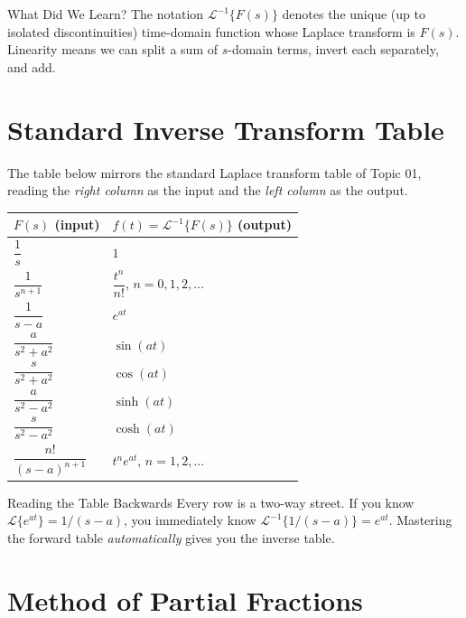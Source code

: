 \documentclass[12pt,a4paper]{article}
\begin{document}
\begin{learnbox}{What Did We Learn?}
The notation $\mathcal{L}^{-1}\{F(s)\}$ denotes the unique (up to isolated
discontinuities) time-domain function whose Laplace transform is $F(s)$.
Linearity means we can split a sum of $s$-domain terms, invert each separately,
and add.
\end{learnbox}

\section{Standard Inverse Transform Table}

The table below mirrors the standard Laplace transform table of Topic 01,
reading the \emph{right column} as the input and the \emph{left column} as the
output.

\begin{center}
\begin{tabular}{@{} l l @{}}
\toprule
\textbf{$F(s)$ (input)} & \textbf{$f(t) = \mathcal{L}^{-1}\{F(s)\}$ (output)} \\
\midrule
$\dfrac{1}{s}$ & $1$ \\[8pt]
$\dfrac{1}{s^{n+1}}$ & $\dfrac{t^{n}}{n!}$, \quad $n = 0, 1, 2, \ldots$ \\[8pt]
$\dfrac{1}{s-a}$ & $e^{at}$ \\[8pt]
$\dfrac{a}{s^{2}+a^{2}}$ & $\sin(at)$ \\[8pt]
$\dfrac{s}{s^{2}+a^{2}}$ & $\cos(at)$ \\[8pt]
$\dfrac{a}{s^{2}-a^{2}}$ & $\sinh(at)$ \\[8pt]
$\dfrac{s}{s^{2}-a^{2}}$ & $\cosh(at)$ \\[8pt]
$\dfrac{n!}{(s-a)^{n+1}}$ & $t^{n}e^{at}$, \quad $n = 1, 2, \ldots$ \\
\bottomrule
\end{tabular}
\end{center}

\begin{learnbox}{Reading the Table Backwards}
Every row is a two-way street.  If you know $\mathcal{L}\{e^{at}\} = 1/(s-a)$,
you immediately know $\mathcal{L}^{-1}\{1/(s-a)\} = e^{at}$.  Mastering the
forward table \emph{automatically} gives you the inverse table.
\end{learnbox}

\section{Method of Partial Fractions}
\end{document}
